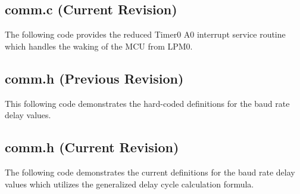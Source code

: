 \documentclass{article}
\begin{document}
	

	\subsection{comm.c (Current Revision)}
The following code provides the reduced Timer0 A0 interrupt service routine which handles the waking of the MCU from LPM0.
	

	\subsection{comm.h (Previous Revision)}
This following code demonstrates the hard-coded definitions for the baud rate delay values. 
	

	\subsection{comm.h (Current Revision)}
The following code demonstrates the current definitions for the baud rate delay values which utilizes the generalized delay cycle calculation formula.
	

\end{document}
